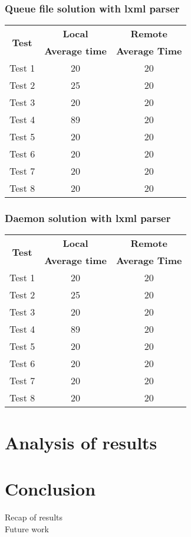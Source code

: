 \subsection{Queue file solution with lxml parser}

\shorthandoff{-}
\begin{center}
    \begin{tabular}{| c | c | c |}
    \hline
    \multirow{2}{*}{\textbf{Test}} & \textbf{Local} & \textbf{Remote} \\ \cline{2-3}
    & \textbf{Average time} & \textbf{Average Time} \\ \hline
    Test 1 & 20 & 20 \\ \hline
    Test 2 & 25 & 20  \\ \hline
    Test 3 & 20 & 20 \\ \hline
    Test 4 & 89 & 20 \\ \hline
    Test 5 & 20 & 20 \\ \hline
    Test 6 & 20 & 20 \\ \hline
    Test 7 & 20 & 20 \\ \hline
    Test 8 & 20 & 20 \\ \hline
    \end{tabular}
\end{center}
\shorthandon{-}

\subsection{Daemon solution with lxml parser}

\shorthandoff{-}
\begin{center}
    \begin{tabular}{| c | c | c |}
    \hline
    \multirow{2}{*}{\textbf{Test}} & \textbf{Local} & \textbf{Remote} \\ \cline{2-3}
    & \textbf{Average time} & \textbf{Average Time} \\ \hline
    Test 1 & 20 & 20 \\ \hline
    Test 2 & 25 & 20  \\ \hline
    Test 3 & 20 & 20 \\ \hline
    Test 4 & 89 & 20 \\ \hline
    Test 5 & 20 & 20 \\ \hline
    Test 6 & 20 & 20 \\ \hline
    Test 7 & 20 & 20 \\ \hline
    Test 8 & 20 & 20 \\ \hline
    \end{tabular}
\end{center}
\shorthandon{-}


\chapter{Analysis of results}
\label{results}

\chapter{Conclusion}
\label{conclusion}
Recap of results
\\
Future work



